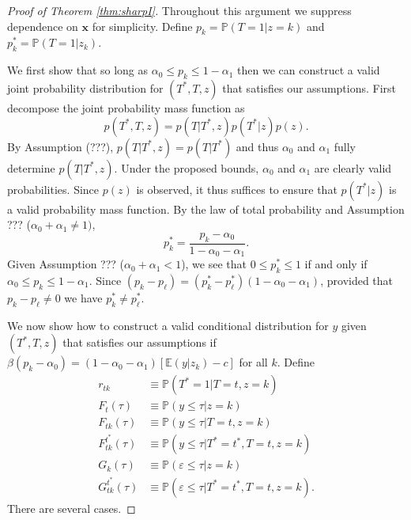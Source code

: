 \documentclass[12pt]{article}
\begin{document}
\begin{proof}[Proof of Theorem \ref{thm:sharpI}]
  Throughout this argument we suppress dependence on $\mathbf{x}$ for simplicity. 
  Define $p_k = \mathbb{P}(T=1|z=k)$ and $p_k^* = \mathbb{P}(T=1|z_k)$.

We first show that so long as $\alpha_0 \leq p_k \leq 1 - \alpha_1$ then we can construct a valid joint probability distribution for $(T^*, T, z)$ that satisfies our assumptions.
First decompose the joint probability mass function as
\[
  p(T^*,T,z) = p(T|T^*,z)p(T^*|z)p(z).
\]
By Assumption (???), $p(T|T^*,z) = p(T|T^*)$ and thus $\alpha_0$ and $\alpha_1$ fully determine $p(T|T^*,z)$.  
Under the proposed bounds, $\alpha_0$ and $\alpha_1$ are clearly valid probabilities.
Since $p(z)$ is observed, it thus suffices to ensure that $p(T^*|z)$ is a valid probability mass function.
By the law of total probability and Assumption ??? ($\alpha_0 + \alpha_1 \neq 1)$, 
\[
  p_k^* = \frac{p_k - \alpha_0}{1 - \alpha_0 - \alpha_1}.
\]
Given Assumption ??? ($\alpha_0 + \alpha_1 < 1$), we see that $0 \leq p_k^* \leq 1$ if and only if $\alpha_0 \leq p_k \leq 1 - \alpha_1$.
Since $(p_k - p_\ell) = (p_k^* - p_\ell^*)(1 - \alpha_0 - \alpha_1)$, provided that $p_k - p_\ell \neq 0$ we have $p^*_k \neq p^*_\ell$. 

We now show how to construct a valid conditional distribution for $y$ given $(T^*,T,z)$ that satisfies our assumptions if $\beta (p_k - \alpha_0) = (1 - \alpha_0 - \alpha_1)[\mathbb{E}(y|z_k) - c]$ for all $k$.
Define
\begin{align*}
r_{tk} &\equiv \mathbb{P}(T^*=1|T=t,z=k)\\
F_{t}(\tau) &\equiv \mathbb{P}(y \leq \tau|z=k) \\
F_{tk}(\tau) &\equiv \mathbb{P}(y \leq \tau|T=t, z=k) \\
F_{tk}^{t^*}(\tau) &\equiv \mathbb{P}(y \leq \tau|T^*=t^*,T=t, z=k)\\
G_k(\tau) &\equiv \mathbb{P}(\varepsilon \leq \tau|z=k)\\
G^{t^*}_{tk}(\tau) &\equiv \mathbb{P}(\varepsilon \leq \tau|T^*=t^*, T=t,z=k).
\end{align*}
There are several cases.


\end{proof}
\end{document}
